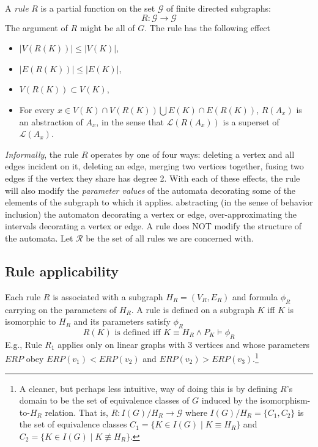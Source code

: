 \documentclass[11pt, oneside, reqno]{article}
\newcommand{\Gc}{\mathcal{G}}
\newcommand{\Lc}{\mathcal{L}}
\newcommand{\Rc}{\mathcal{R}}
\begin{document}
A \emph{rule} $R$ is a partial function on the set $\Gc$ of finite directed subgraphs:
\[R: \Gc \rightarrow \Gc\]
The argument of $R$ might be all of $G$.
The rule has the following effect
\begin{itemize}
	\item $|V(R(K))| \leq |V(K)|$,
	\item $|E(R(K))| \leq |E(K)|$,
	\item $V(R(K)) \subset V(K)$,
	\item For every $x \in V(K) \cap V(R(K)) \bigcup E(K) \cap E(R(K))$, $R(A_x)$ is an abstraction of $A_x$, in the sense that $\Lc(R(A_x))$ is a superset of $\Lc(A_x)$.
\end{itemize}
\emph{Informally}, the rule $R$ operates by one of four ways: deleting a vertex and all edges incident on it, deleting an edge, merging two vertices together, fusing two edges if the vertex they share has degree 2.
With each of these effects, the rule will also modify the \emph{parameter values} of the automata decorating some of the elements of the subgraph to which it applies.
abstracting (in the sense of behavior inclusion) the automaton decorating a vertex or edge, over-approximating the intervals decorating a vertex or edge.
A rule does NOT modify the structure of the automata.
Let $\Rc$ be the set of all rules we are concerned with.

\subsection{Rule applicability}
\label{ruleApplicability}
Each rule $R$ is associated with a subgraph $H_R = (V_R,E_R)$ and formula $\phi_R$ carrying on the parameters of $H_R$.
A rule is defined on a subgraph $K$ iff $K$ is isomorphic to $H_R$ and its parameters satisfy $\phi_R$
\begin{equation}
\label{eq:applicableR}
R(K) \textrm{ is defined iff } K \equiv H_R \land P_K \models \phi_R
\end{equation}
E.g., Rule $R_1$ applies only on linear graphs with 3 vertices and whose parameters $ERP$ obey $ERP(v_1) < ERP(v_2)$ and $ERP(v_2) > ERP(v_3)$.\footnote{A cleaner, but perhaps less intuitive, way of doing this is by defining $R$'s domain to be the set of equivalence classes of $G$ induced by the isomorphism-to-$H_R$ relation. 
	That is, $R: I(G)/H_R  \rightarrow \Gc$ where $I(G)/H_R = \{C_1,C_2\}$ is the set of equivalence classes $C_1 = \{K \in I(G) \;|\; K \equiv H_R \}$ and $C_2 = \{K \in I(G) \;|\; K \not \equiv H_R\}$.
}
\end{document}
